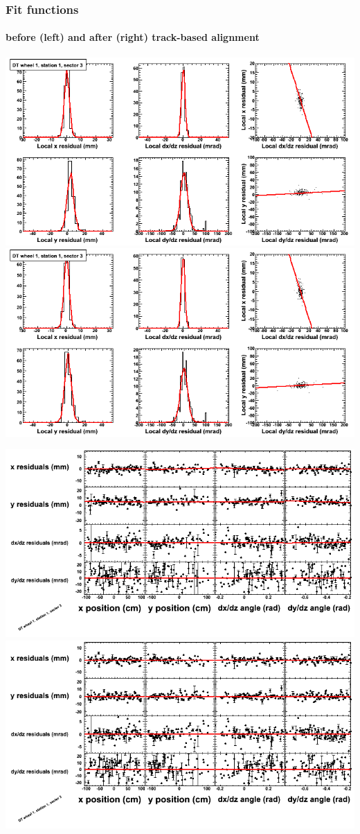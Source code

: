 \documentclass[compress]{beamer}
\begin{document}
\begin{frame}
\frametitle{Fit functions}
\framesubtitle{before (left) and after (right) track-based alignment}
\includegraphics[width=0.5\linewidth]{fitfunctions_re01/MBwhDst1sec03_bellcurves.png} \includegraphics[width=0.5\linewidth]{fitfunctions_re05/MBwhDst1sec03_bellcurves.png}

\includegraphics[width=0.5\linewidth]{fitfunctions_re01/MBwhDst1sec03_polynomials.png} \includegraphics[width=0.5\linewidth]{fitfunctions_re05/MBwhDst1sec03_polynomials.png}
\end{frame}
\end{document}

